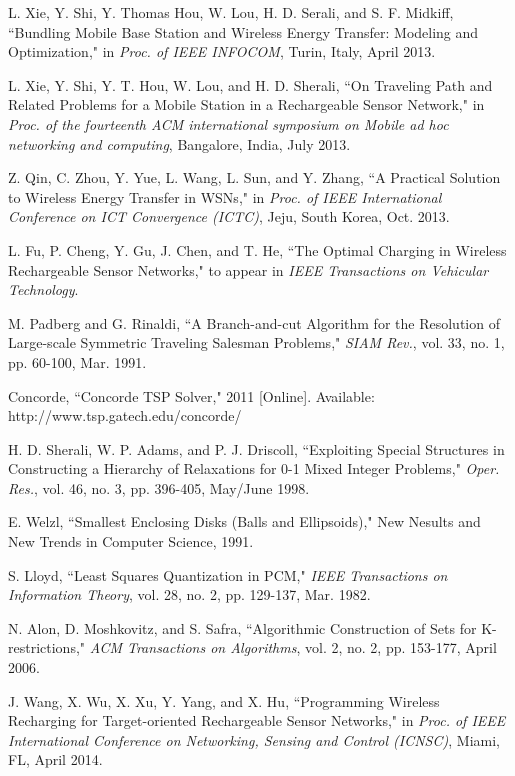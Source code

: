 \documentclass[twocolumn,10pt]{IEEEtran}
\begin{document}
\begin{thebibliography}{99}
L. Xie, Y. Shi, Y. Thomas Hou, W. Lou, H. D. Serali, and S. F. Midkiff, ``Bundling Mobile Base Station and Wireless Energy Transfer: Modeling and Optimization," in \emph{Proc. of IEEE INFOCOM}, Turin, Italy, April 2013. 


L. Xie, Y. Shi, Y. T. Hou, W. Lou, and H. D. Sherali, ``On Traveling Path and Related Problems for a Mobile Station in a Rechargeable Sensor Network," in \emph{Proc. of the fourteenth ACM international symposium on Mobile ad hoc networking and computing}, Bangalore, India, July 2013.



Z. Qin, C. Zhou, Y. Yue, L. Wang, L. Sun, and Y. Zhang, ``A Practical Solution to Wireless Energy Transfer in WSNs," in \emph{Proc. of IEEE International Conference on ICT Convergence (ICTC)}, Jeju, South Korea, Oct. 2013.
 
L. Fu, P. Cheng, Y. Gu, J. Chen, and T. He,  ``The Optimal Charging in Wireless Rechargeable Sensor Networks," 
to appear in \emph{IEEE Transactions on Vehicular Technology}.

M. Padberg and G. Rinaldi, ``A Branch-and-cut Algorithm for the Resolution of Large-scale Symmetric Traveling Salesman Problems," \emph{SIAM Rev.}, vol. 33, no. 1, pp. 60-100, Mar. 1991.

Concorde, ``Concorde TSP Solver," 2011 [Online]. Available: http://www.tsp.gatech.edu/concorde/

H. D. Sherali, W. P. Adams, and P. J. Driscoll, ``Exploiting Special Structures in Constructing a Hierarchy of Relaxations for 0-1 Mixed Integer Problems," \emph{Oper. Res.}, vol. 46, no. 3, pp. 396-405, May/June
1998. 
 
E. Welzl, ``Smallest Enclosing Disks (Balls and Ellipsoids)," New Nesults
and New Trends in Computer Science, 1991.

S. Lloyd, ``Least Squares Quantization in PCM," \emph{IEEE Transactions on Information Theory}, vol. 28, no. 2, pp. 129-137, Mar. 1982.

N. Alon, D. Moshkovitz, and S. Safra, ``Algorithmic Construction of Sets for K-restrictions," \emph{ACM Transactions on Algorithms}, vol. 2, no. 2, pp. 153-177, April 2006. 
 
J. Wang, X. Wu, X. Xu, Y. Yang, and X. Hu, ``Programming Wireless Recharging for Target-oriented Rechargeable Sensor Networks," in \emph{Proc. of IEEE International Conference on  Networking, Sensing and Control (ICNSC)},  Miami, FL, April 2014. 




\end{thebibliography}
\end{document}
